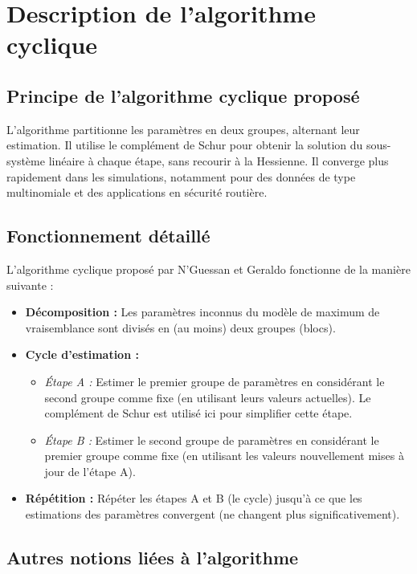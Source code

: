 \documentclass[12pt,a4paper]{article}
\begin{document}
	
	\section{Description de l’algorithme cyclique}
	\subsection{Principe de l'algorithme cyclique proposé} %
	L'algorithme partitionne les paramètres en deux groupes, alternant leur estimation.
	Il utilise le complément de Schur pour obtenir la solution du sous-système linéaire à chaque étape, sans recourir à la Hessienne.
	Il converge plus rapidement dans les simulations, notamment pour des données de type multinomiale et des applications en sécurité routière.
	
	\subsection{Fonctionnement détaillé} %
	L'algorithme cyclique proposé par N’Guessan et Geraldo fonctionne de la manière suivante :
	\begin{itemize}
		\item \textbf{Décomposition :} Les paramètres inconnus du modèle de maximum de vraisemblance sont divisés en (au moins) deux groupes (blocs).
		\item \textbf{Cycle d'estimation :}
		\begin{itemize}
			\item \textit{Étape A :} Estimer le premier groupe de paramètres en considérant le second groupe comme fixe (en utilisant leurs valeurs actuelles). Le complément de Schur est utilisé ici pour simplifier cette étape.
			\item \textit{Étape B :} Estimer le second groupe de paramètres en considérant le premier groupe comme fixe (en utilisant les valeurs nouvellement mises à jour de l'étape A).
		\end{itemize}
		\item \textbf{Répétition :} Répéter les étapes A et B (le cycle) jusqu'à ce que les estimations des paramètres convergent (ne changent plus significativement).
	\end{itemize}
	
	\subsection{Autres notions liées à l'algorithme}
	
\end{document}
